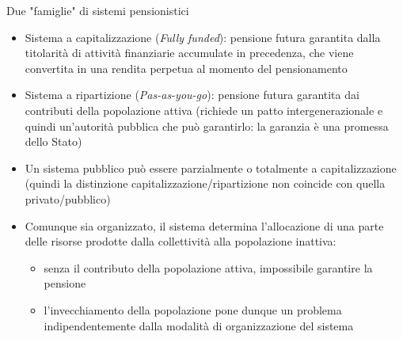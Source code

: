 \documentclass[11pt]{beamer}
\begin{document}
\begin{frame}{Due "famiglie" di sistemi pensionistici}
\begin{itemize}
\item \alert{Sistema a capitalizzazione} (\emph{Fully funded}): pensione futura garantita
dalla titolarità di attività finanziarie accumulate in precedenza, che viene
convertita in una rendita perpetua al momento del pensionamento
\item \alert{Sistema a ripartizione} (\emph{Pas-as-you-go}): pensione futura garantita dai
contributi della popolazione attiva (richiede un patto intergenerazionale e
quindi un'autorità pubblica che può garantirlo: la garanzia è una promessa
dello Stato)
\item Un sistema pubblico può essere parzialmente o totalmente a capitalizzazione
(quindi la distinzione capitalizzazione/ripartizione non coincide con quella
privato/pubblico)
\item Comunque sia organizzato, il sistema determina l'allocazione di una parte
delle risorse prodotte dalla collettività alla popolazione
inattiva:
\begin{itemize}
\item senza il contributo della popolazione attiva, impossibile garantire la
pensione
\item l'invecchiamento della popolazione pone dunque un problema
indipendentemente dalla modalità di organizzazione del sistema
\end{itemize}
\end{itemize}
\end{frame}
\end{document}
